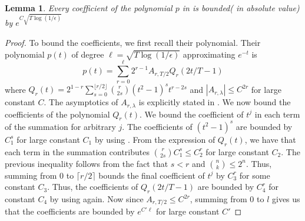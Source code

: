 \documentclass[10pt,a4paper]{article}
\newtheorem{lemma}{Lemma}[section]
\newcommand{\1}{\Ind}
\newcommand{\lamdba}{\lambda}
\begin{document}
\begin{lemma}
    Every coefficient of the polynomial $p$ in  is bounded( in absolute value) by $e^{C\sqrt{T\log(1/\epsilon)}}$
\end{lemma}
\begin{proof}
To bound the coefficients, we first recall their polynomial. Their polynomial $p(t)$ of degree $\ell=\sqrt{T\log(1/\epsilon)}$ approximating $e^{-t}$ is 
\[
p(t)=\sum_{r=0}^{\ell}2^{r-1}A_{r,T/2}Q_r(2t/T-1)    
\] where $Q_r(t)=2^{1-r}\sum_{s=0}^{\lfloor r/2\rfloor}\binom{r}{2s}(t^2-1)^{s}t^{r-2s}$ and $|A_{r,\lamdba}|\leq C^{2r}$ for large constant $C$. The asymptotics of $A_{r,\lambda}$ is explicitly stated in \cite{AA22}. We now bound the coefficients of the polynomial $Q_r(t)$. We bound the coefficient of $t^j$ in each term of the summation for arbitrary $j$. The coefficients of $(t^2-1)^s$ are bounded by $C_1^{s}$ for large constant $C_1$ by using .  From the expression of $Q_r(t)$, we have that each term in the summation contributes $\binom{r}{2s}C_1^{s}\leq C_2^{r}$ for large constant $C_2$. The previous inequality follows from the fact that $s<r$ and $\binom{n}{k}\leq 2^n$. Thus, summing from $0$ to $\lceil r/2\rceil$ bounds the final coefficient of $t^j$ by $C_3^{r}$ for some constant $C_3$. Thus, the coefficients of $Q_r(2t/T-1)$ are bounded by $C_4^r$ for constant $C_4$ by using  again. Now since $A_{r,T/2}\leq C^{2r}$, summing from $0$ to $l$ gives us that the coefficients are bounded by $e^{C'\ell}$ for large constant $C'$
\end{proof}
\end{document}
